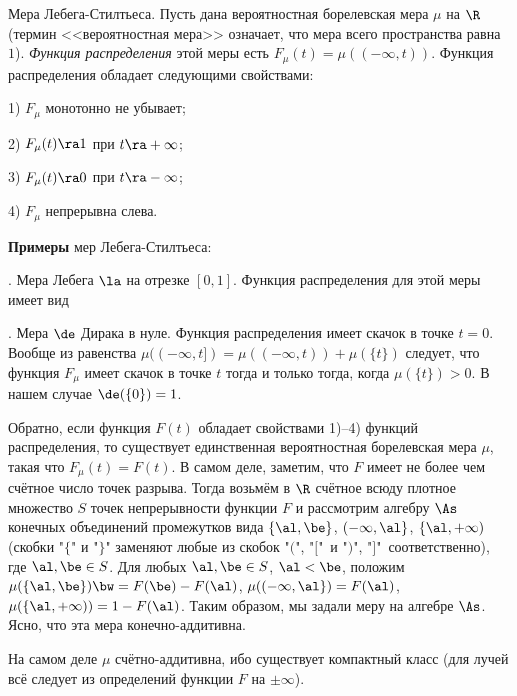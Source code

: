 \documentclass[10pt]{article}
\begin{document}
\begin{ex}\label{Lebeg-Stilt'es}
Мера Лебега-Стилтьеса. Пусть дана вероятностная борелевская мера
$\mu$ на $\R$ (термин <<вероятностная мера>> означает, что мера
всего пространства равна $1$). \emph{Функция распределения} этой
меры есть $F_{\mu}(t)=\mu((-\infty,t))$. Функция распределения
обладает следующими свойствами:

1) $F_{\mu}$ монотонно не убывает;

2) $F_{\mu}(t)\ra 1$ при $t\ra+\infty$;

3) $F_{\mu}(t)\ra0$ при $t\ra-\infty$;

4) $F_{\mu}$ непрерывна слева.
\end{ex}

\textbf{Примеры} мер Лебега-Стилтьеса:

. Мера Лебега $\la$ на отрезке $[0,1]$. Функция распределения
для этой меры имеет вид 

. Мера $\de$ Дирака в нуле. Функция распределения
 имеет скачок в
точке $t=0$. Вообще из равенства
$\mu((-\infty,t])=\mu((-\infty,t))+\mu(\{t\})$ следует, что функция
$F_{\mu}$ имеет скачок в точке $t$ тогда и только тогда, когда
$\mu(\{t\})>0$. В нашем случае $\de(\{0\})=1$.

Обратно, если функция $F(t)$ обладает свойствами 1)--4) функций
распределения, то существует единственная вероятностная борелевская
мера $\mu$, такая что $F_{\mu}(t)=F(t)$. В самом деле, заметим, что
$F$ имеет не более чем счётное число точек разрыва. Тогда возьмём в
$\R$ счётное всюду плотное множество $S$ точек непрерывности функции
$F$ и рассмотрим алгебру $\As$ конечных объединений промежутков вида
$\{\al,\be\}$, $(-\infty,\al\}$, $\{\al,+\infty)$ (скобки "$\{$" и
"$\}$" заменяют любые из скобок "$($", "$[$" \,и "$)$", "$]$"\,
соответственно), где $\al,\be\in S$. Для любых $\al,\be\in S$,
$\al<\be$, положим $\mu(\{\al,\be\})\bw =F(\be)-F(\al)$,
$\mu((-\infty,\al\})=F(\al)$, $\mu(\{\al,+\infty))=1-F(\al)$. Таким
образом, мы задали меру на алгебре $\As$. Ясно, что эта мера
конечно-аддитивна.

\begin{note}
На самом деле $\mu$ счётно-аддитивна, ибо существует компактный
класс (для лучей всё следует из определений функции $F$ на
$\pm\infty$).
\end{note}
\end{document}
